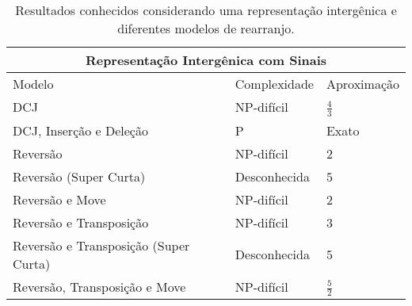 \begin{table}[!htb]
  \caption[Resultados conhecidos considerando uma representação intergênica e diferentes modelos de rearranjo.]{Resultados conhecidos considerando uma representação intergênica e diferentes modelos de rearranjo.}
  \label{table:GNCKDPJY}
  \centering
  \begin{tabular}{|p{8cm}|p{3cm}|p{3cm}|}
    \hline
    \multicolumn{3}{|c|}{Representação Intergênica com Sinais}                                                                                   \\ \hline
    Modelo                                  & Complexidade                                 & Aproximação                                         \\ \hline
    DCJ                                     & NP-difícil~\cite{2017-fertin-etal}           & $\frac{4}{3}$~\cite{2017-fertin-etal}               \\ \hline
    DCJ, Inserção e Deleção                 & P~\cite{2016b-bulteau-etal}                  & Exato~\cite{2016b-bulteau-etal}                     \\ \hline
    Reversão                                & NP-difícil~\cite{2021b-oliveira-etal}        & $2$~\cite{2021b-oliveira-etal}                      \\ \hline
    Reversão (Super Curta)                  & Desconhecida                                 & $5$~\cite{2019c-oliveira-etal}                      \\ \hline
    Reversão e Move                         & NP-difícil~\cite{2022b-brito-etal}           & $2$~\cite{2022b-brito-etal}                         \\ \hline
    Reversão e Transposição                 & NP-difícil~\cite{2021a-oliveira-etal}        & $3$~\cite{2021b-oliveira-etal}                      \\ \hline
    Reversão e Transposição (Super Curta)   & Desconhecida                                 & $5$~\cite{2019c-oliveira-etal}                      \\ \hline
    Reversão, Transposição e Move           & NP-difícil~\cite{2021a-oliveira-etal}        & $\frac{5}{2}$~\cite{2021a-oliveira-etal}            \\ \hline
  \end{tabular}

  \hfill \break


\end{table}
